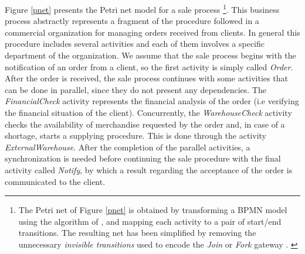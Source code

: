 \documentclass{llncs}
\begin{document}
Figure \ref{pnet} presents the Petri net model for a sale
process
\footnote{\small{
The Petri net of Figure \ref{pnet} is obtained by
transforming a BPMN model using the algorithm of \cite{DBLP:conf/wsfm/BruniCFFGS11}, and mapping
each activity to a pair of start/end transitions. The resulting net
has been simplified by removing the unnecessary \emph{invisible
  transitions} used to encode the \emph{Join} or \emph{Fork} gateway \cite{DBLP:conf/wsfm/BruniCFFGS11}.
}}.
This business process abstractly represents a fragment of the
procedure followed in a commercial organization for managing orders
received from clients. In general this procedure includes several
activities and each of them involves a specific department of the
organization. We assume that the sale process begins with the
notification of an order from a client, so the first activity is
simply called \emph{Order}. After the order is received, the sale
process continues with some activities that can be done in parallel,
since they do not present any dependencies. The \emph{FinancialCheck}
activity represents the financial analysis of the order  (i.e
verifying the financial situation of the client). Concurrently, the
\emph{WarehouseCheck} activity checks the availability of merchandise
requested by the order and, in case of a shortage, starts a supplying procedure. This is done through the activity \emph{ExternalWarehouse}. After the completion of the  parallel activities, a synchronization is needed before continuing the sale procedure with the final activity called \emph{Notify}, by which a result regarding the acceptance of the order is communicated to the client.

\end{document}

